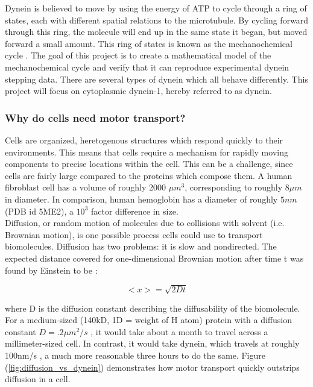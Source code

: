 \documentclass[10pt]{article} %
\begin{document}
Dynein is believed to move by using the energy of ATP to cycle through a ring of states, each with different spatial relations to the microtubule. By cycling forward through this ring, the molecule will end up in the same state it began, but moved forward a small amount. This ring of states is known as the mechanochemical cycle \cite{cianfroccoreview}. The goal of this project is to create a mathematical model of the mechanochemical cycle and verify that it can reproduce experimental dynein stepping data. There are several types of dynein which all behave differently. This project will focus on cytoplasmic dynein-1, hereby referred to as dynein.\\

\subsubsection{Why do cells need motor transport?}
Cells are organized, heretogenous structures which respond quickly to their environments. This means that cells require a mechanism for rapidly moving components to precise locations within the cell. This can be a challenge, since cells are fairly large compared to the proteins which compose them. A human fibroblast cell has a volume of roughly 2000 $\mu m^3$\cite{fibroblastvolume}, corresponding to roughly $8 \mu m$ in diameter. In comparison, human hemoglobin has a diameter of roughly $5 nm$ (PDB id 5ME2), a $10^3$ factor difference in size.\\

Diffusion, or random motion of molecules due to collisions with solvent (i.e. Brownian motion), is one possible process cells could use to transport biomolecules. Diffusion has two problems: it is slow and nondirected. The expected distance covered for one-dimensional Brownian motion after time t was found by Einstein to be \cite{einstein-paper}:

\begin{equation}
  \label{diffusion-equation}
  <x> = \sqrt{2Dt}
\end{equation}

where D is the diffusion constant describing the diffusability of the biomolecule. For a medium-sized (140kD, 1D = weight of H atom) protein with a diffusion constant $D = .2 \mu m^2/s$ \cite{diffusionconstants}, it would take about a month to travel across a millimeter-sized cell. In contrast, it would take dynein, which travels at roughly 100nm/s \cite{weihongpaper}, a much more reasonable three hours to do the same. Figure (\ref{fig:diffusion_vs_dynein}) demonstrates how motor transport quickly outstrips diffusion in a cell.\\
\end{document}
